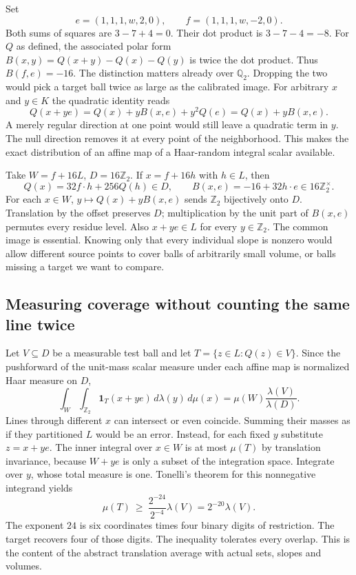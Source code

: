 \documentclass[12pt,letterpaper]{article}
\begin{document}
Set
\[
 e=(1,1,1,w,2,0),\qquad f=(1,1,1,w,-2,0).
\]
Both sums of squares are $3-7+4=0$. Their dot product is $3-7-4=-8$. For $Q$ as defined, the associated polar form $B(x,y)=Q(x+y)-Q(x)-Q(y)$ is twice the dot product. Thus $B(f,e)=-16$. The distinction matters already over $\mathbb Q_2$. Dropping the two would pick a target ball twice as large as the calibrated image. For arbitrary $x$ and $y\in K$ the quadratic identity reads
\[
 Q(x+ye)=Q(x)+yB(x,e)+y^2 Q(e)=Q(x)+yB(x,e).
\]
A merely regular direction at one point would still leave a quadratic term in $y$. The null direction removes it at every point of the neighborhood. This makes the exact distribution of an affine map of a Haar-random integral scalar available.

Take $W=f+16L$, $D=16\mathbb Z_2$. If $x=f+16h$ with $h\in L$, then
\[
   Q(x)=32 f\cdot h+256Q(h)\in D,\qquad
   B(x,e)=-16+32h\cdot e\in16\mathbb Z_2^\times .
\]
For each $x\in W$, $y\mapsto Q(x)+yB(x,e)$ sends $\mathbb Z_2$ bijectively onto $D$. Translation by the offset preserves $D$; multiplication by the unit part of $B(x,e)$ permutes every residue level. Also $x+ye\in L$ for every $y\in\mathbb Z_2$. The common image is essential. Knowing only that every individual slope is nonzero would allow different source points to cover balls of arbitrarily small volume, or balls missing a target we want to compare.

\subsection{Measuring coverage without counting the same line twice}
Let $V\subseteq D$ be a measurable test ball and let $T=\{z\in L:Q(z)\in V\}$. Since the pushforward of the unit-mass scalar measure under each affine map is normalized Haar measure on $D$,
\[
 \int_{W}\int_{\mathbb Z_2}\mathbf1_T(x+ye)\,d\lambda(y)\,d\mu(x)
        =\mu(W)\frac{\lambda(V)}{\lambda(D)}.
\]
Lines through different $x$ can intersect or even coincide. Summing their masses as if they partitioned $L$ would be an error. Instead, for each fixed $y$ substitute $z=x+ye$. The inner integral over $x\in W$ is at most $\mu(T)$ by translation invariance, because $W+ye$ is only a subset of the integration space. Integrate over $y$, whose total measure is one. Tonelli's theorem for this nonnegative integrand yields
\[
        \mu(T)\ \ge\ \frac{2^{-24}}{2^{-4}}\lambda(V)
                      =2^{-20}\lambda(V).
\]
The exponent $24$ is six coordinates times four binary digits of restriction. The target recovers four of those digits. The inequality tolerates every overlap. This is the content of the abstract translation average with actual sets, slopes and volumes.
\end{document}
